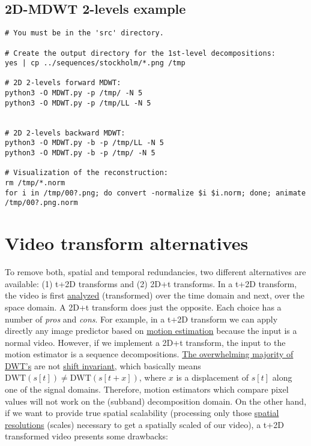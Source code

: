 \subsection{2D-MDWT 2-levels example}
\begin{verbatim}
# You must be in the 'src' directory.

# Create the output directory for the 1st-level decompositions:
yes | cp ../sequences/stockholm/*.png /tmp

# 2D 2-levels forward MDWT:
python3 -O MDWT.py -p /tmp/ -N 5
python3 -O MDWT.py -p /tmp/LL -N 5


# 2D 2-levels backward MDWT:
python3 -O MDWT.py -b -p /tmp/LL -N 5
python3 -O MDWT.py -b -p /tmp/ -N 5

# Visualization of the reconstruction:
rm /tmp/*.norm
for i in /tmp/00?.png; do convert -normalize $i $i.norm; done; animate /tmp/00?.png.norm
\end{verbatim}


\section{Video transform alternatives}

To remove both, spatial and temporal redundancies, two different
alternatives are available: (1) t+2D transforms and (2) 2D+t
transforms. In a t+2D transform, the video is first
\href{https://en.wikipedia.org/wiki/Digital_filter\#Analysis_techniques}{analyzed}
(transformed) over the time domain and next, over the space domain. A
2D+t transform does just the opposite. Each choice has a number of
\emph{pros} and \emph{cons}. For example, in a t+2D transform we can
apply directly any image predictor based on
\href{https://en.wikipedia.org/wiki/Motion_estimation}{motion
  estimation} because the input is a normal video. However, if we
implement a 2D+t transform, the input to the motion estimator is a
sequence decompositions.
\href{http://www.polyvalens.com/blog/wavelets/theory}{The overwhelming
  majority of DWT's} are not
\href{http://www.polyvalens.com/blog/wavelets/theory}{shift
  invariant}, which basically means $\text{DWT}(s[t]) \neq
\text{DWT}(s[t+x])$, where $x$ is a displacement of $s[t]$ along one of the
signal domains.  Therefore, motion estimators which compare pixel values
will not work on the (subband) decomposition domain. On the other
hand, if we want to provide true spatial scalability (processing only
those
\href{https://www.tutorialspoint.com/dip/spatial_resolution.htm}{spatial
  resolutions} (scales) necessary to get a spatially scaled of our
video), a t+2D transformed video presents some drawbacks:

